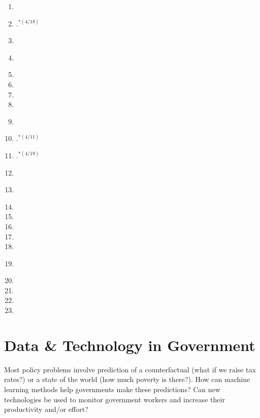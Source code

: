 \documentclass[11pt]{article}
\begin{document}
\begin{enumerate}
\item {}
\item {}.$^{*(4/18)}$
\item {}
\item \textbf{}
\item {}
\item {}
\item {}
\item {}
\item \textbf{}
\item {}.$^{*(4/11)}$
\item {}.$^{*(4/19)}$
\item {}
\item \textbf{}
\item {}
\item {}
\item {}
\item {}
\item {}
\item \textbf{}
\item {}
\item {}
\item {}
\item {}
\end{enumerate}

\section{Data \& Technology in Government}
Most policy problems involve prediction of a counterfactual (what if we raise tax rates?) or a state of the world (how much poverty is there?). How can machine learning methods help governments make these predictions? Can new technologies be used to monitor government workers and increase their productivity and/or effort?
\end{document}
